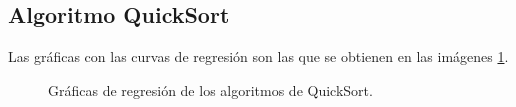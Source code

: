 \documentclass{homework}
\begin{document}
    \subsection{Algoritmo QuickSort}

    Las gráficas con las curvas de regresión son las que se obtienen en las imágenes \ref{hib:quicksort}.

    \begin{figure}
        \centering


        \caption{Gráficas de regresión de los algoritmos de QuickSort.}

        \label{hib:quicksort}
    \end{figure}
\end{document}
